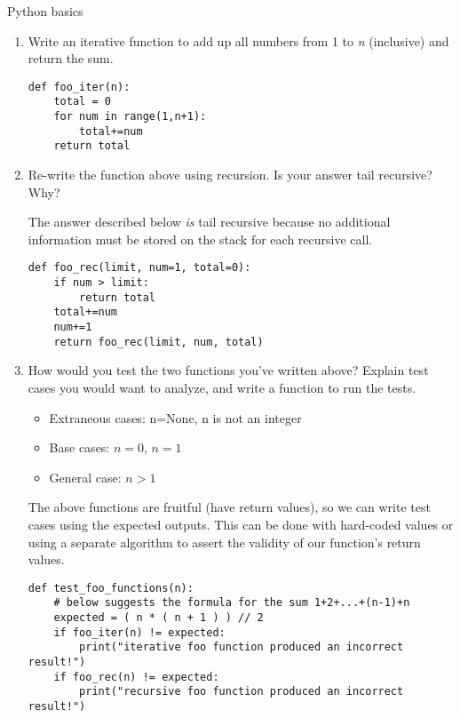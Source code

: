 Python basics
\begin{enumerate}

\item Write an iterative function to add up all numbers from 1 to \emph{n} (inclusive) and return the sum.

\begin{answer}
\begin{lstlisting}
def foo_iter(n):
	total = 0
	for num in range(1,n+1):
		total+=num
	return total
\end{lstlisting}
\end{answer}

\item Re-write the function above using recursion. Is your answer tail recursive?  Why?

\begin{answer}
The answer described below \emph{is} tail recursive because no additional information must be stored on the stack for each recursive call.

\begin{lstlisting}
def foo_rec(limit, num=1, total=0):
	if num > limit:
		return total
	total+=num
	num+=1
	return foo_rec(limit, num, total)
\end{lstlisting}
\end{answer}

\item How would you test the two functions you've written above? Explain test cases you would want to analyze, and write a function to run the tests.

\begin{answer}
\begin{itemize}
\item Extraneous cases: n=None, n is not an integer
\item Base cases: $n=0$, $n=1$
\item General case: $n > 1$
\end{itemize}
The above functions are fruitful (have return values), so we can write test cases using the expected outputs. This can be done with hard-coded values or using a separate algorithm
to assert the validity of our function's return values.
\begin{lstlisting}
def test_foo_functions(n):
	# below suggests the formula for the sum 1+2+...+(n-1)+n
	expected = ( n * ( n + 1 ) ) // 2
	if foo_iter(n) != expected:
		print("iterative foo function produced an incorrect result!")
	if foo_rec(n) != expected:
		print("recursive foo function produced an incorrect result!")
\end{lstlisting}
\end{answer}

\end{enumerate}




